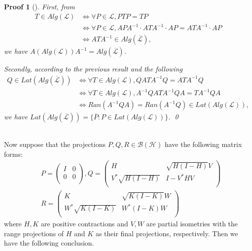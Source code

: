 \documentclass{jaums}
\theoremstyle{thmit} %
\theoremstyle{thmrm} %
\newtheorem*{oldproof}{Proof}
\renewenvironment{proof}[1][{}]{\begin{oldproof}[#1]}{\qed\end{oldproof}}
\begin{document}
\begin{proof} First, from
\begin{align*} T\in Alg(\mathcal{L})&\Leftrightarrow \forall P\in\mathcal{L},
PTP=TP\\
&\Leftrightarrow \forall P\in\mathcal{L}, APA^{-1}\cdot ATA^{-1}\cdot
AP=ATA^{-1}\cdot AP\\
&\Leftrightarrow ATA^{-1}\in Alg(\overline{\mathcal{L}}),
\end{align*}
we have $A(Alg(\mathcal{L}))A^{-1}= Alg(\overline{\mathcal{L}})$.

Secondly, according to the previous result and the following
\begin{align*} Q\in Lat(Alg(\overline{\mathcal{L}}))&\Leftrightarrow \forall
T\in Alg(\mathcal{L}), QATA^{-1}Q=ATA^{-1}Q\\
&\Leftrightarrow\forall T\in Alg(\mathcal{L}), A^{-1}QATA^{-1}QA=TA^{-1}QA\\
&\Leftrightarrow Ran(A^{-1}QA)=Ran(A^{-1}Q)\in Lat(Alg(\mathcal{L})),
\end{align*}
we have $Lat(Alg(\overline{\mathcal{L}}))=\{\overline{P}:P\in
Lat(Alg(\mathcal{L}))\}$.
\end{proof}\\

Now suppose that the projections $P,Q,R\in\mathcal{B}(\mathcal{H})$ have the
following matrix forms:
\begin{align*}&P=\left(
                    \begin{array}{cc}
                      I & 0 \\
                      0 & 0 \\
                    \end{array}
                  \right),
                  Q=\left(
          \begin{array}{cc}
            H & \sqrt{H(I-H)}V \\
            V^*\sqrt{H(I-H)} & I-V^*HV \\
          \end{array}
        \right)\\
 &R=\left(
          \begin{array}{cc}
            K & \sqrt{K(I-K)}W \\
            W^*\sqrt{K(I-K)} & W^*(I-K)W \\
          \end{array}
        \right)
 \end{align*} where $H,K$ are positive contractions and $V,W$ are partial
isometries with the range projections of $H$ and $K$ as their final projections,
respectively.
 Then we have the following conclusion.
\end{document}
